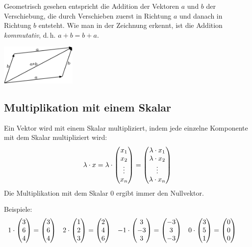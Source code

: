 			\noindent Geometrisch gesehen entspricht die Addition der Vektoren $a$ und $b$
			der Verschiebung, die durch Verschieben zuerst in Richtung $a$ und danach in
			Richtung $b$ entsteht. Wie man in der Zeichnung erkennt, ist die Addition
			\emph{kommutativ}, d.\,h. $a+b = b+a$.
			\begin{center}
				\includegraphics[height=2cm]{img/vektor_addition} 
			\end{center}
	
		\subsection{Multiplikation mit einem Skalar}
			Ein Vektor wird mit einem Skalar multipliziert, indem jede einzelne
			Komponente mit dem Skalar multipliziert wird:
			\[\lambda\cdot x = \lambda\cdot \mvect{x_1 \\ x_2 \\ \vdots \\ x_n} =
			\mvect{\lambda\cdot x_1 \\ \lambda\cdot x_2 \\ \vdots \\ \lambda\cdot x_n}\]
			Die Multiplikation mit dem Skalar $0$ ergibt immer den Nullvektor.
			
			Beispiele:
			\[\hspace{-15.14pt}\begin{array}{cccc}
				 1\cdot\mvect{3\\6\\4}=\mvect{3\\6\\4} & 2\cdot\mvect{1\\2\\3}=\mvect{2\\4\\6} &
				 -1\cdot\mvect{3\\-3\\3} = \mvect{-3\\3\\-3} &
                 0\cdot
				\mvect{3\\5\\1}=\mvect{0\\0\\0}
			\end{array}\]
			
